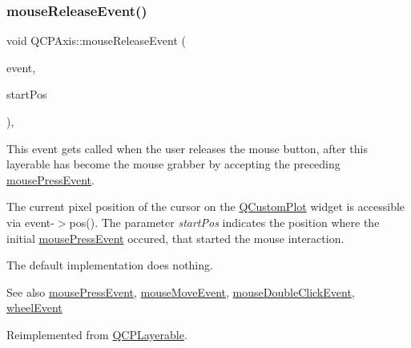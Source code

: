 \mbox{\label{class_q_c_p_axis_a35663b938ad83e91c0b8e59dbc8c6b18}} 
\subsubsection{\texorpdfstring{mouse\+Release\+Event()}{mouseReleaseEvent()}}
{\footnotesize\ttfamily void Q\+C\+P\+Axis\+::mouse\+Release\+Event (\begin{DoxyParamCaption}\item[{Q\+Mouse\+Event $\ast$}]{event,  }\item[{const Q\+PointF \&}]{start\+Pos }\end{DoxyParamCaption})\hspace{0.3cm}{\ttfamily [protected]}, {\ttfamily [virtual]}}

This event gets called when the user releases the mouse button, after this layerable has become the mouse grabber by accepting the preceding \hyperlink{class_q_c_p_axis_ac89c068873ee9197a5d2af715bdc1105}{mouse\+Press\+Event}.

The current pixel position of the cursor on the \hyperlink{class_q_custom_plot}{Q\+Custom\+Plot} widget is accessible via {\ttfamily event-\/$>$pos()}. The parameter {\itshape start\+Pos} indicates the position where the initial \hyperlink{class_q_c_p_axis_ac89c068873ee9197a5d2af715bdc1105}{mouse\+Press\+Event} occured, that started the mouse interaction.

The default implementation does nothing.

\begin{DoxySeeAlso}{See also}
\hyperlink{class_q_c_p_axis_ac89c068873ee9197a5d2af715bdc1105}{mouse\+Press\+Event}, \hyperlink{class_q_c_p_axis_a2a89a13440eec099fc2327c2672be0cd}{mouse\+Move\+Event}, \hyperlink{class_q_c_p_layerable_a4171e2e823aca242dd0279f00ed2de81}{mouse\+Double\+Click\+Event}, \hyperlink{class_q_c_p_axis_a71643d27524a843230b5ba68085b3d9b}{wheel\+Event} 
\end{DoxySeeAlso}


Reimplemented from \hyperlink{class_q_c_p_layerable_aa0d79b005686f668622bbe66ac03ba2c}{Q\+C\+P\+Layerable}.

\mbox{\label{class_q_c_p_axis_a18f3a68f2b691af1fd34b6593c886630}} 
